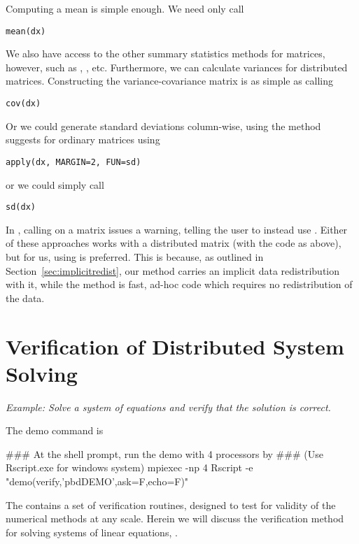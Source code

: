 Computing a mean is simple enough.  We need only call
\begin{lstlisting}[language=rr,title=Summary Statistics]
mean(dx)
\end{lstlisting}
We also have access to the other summary statistics methods for matrices, however, such as , , etc.  Furthermore, we can calculate variances for distributed matrices.  Constructing the variance-covariance matrix is as simple as calling
\begin{lstlisting}[language=rr,title=Summary Statistics]
cov(dx)
\end{lstlisting}
Or we could generate standard deviations column-wise, using the method  suggests for ordinary matrices using 
\begin{lstlisting}[language=rr,title=Summary Statistics]
apply(dx, MARGIN=2, FUN=sd)
\end{lstlisting}
or we could simply call
\begin{lstlisting}[language=rr,title=Summary Statistics]
sd(dx)
\end{lstlisting}
In , calling  on a matrix issues a warning, telling the user to instead use .  Either of these approaches works with a distributed matrix (with the code as above), but for us, using  is preferred.  This is because, as outlined in Section~\ref{sec:implicitredist}, our  method carries an implicit data redistribution with it, while the  method is fast, ad-hoc code which requires no redistribution of the data.





\section{Verification of Distributed System Solving}

\emph{Example:  Solve a system of equations and verify that the solution is correct.}

The demo command is
\begin{Command}
### At the shell prompt, run the demo with 4 processors by
### (Use Rscript.exe for windows system)
mpiexec -np 4 Rscript -e "demo(verify,'pbdDEMO',ask=F,echo=F)"
\end{Command}

The  contains a set of verification routines, designed to test for validity of the numerical methods at any scale.  Herein we will discuss the verification method for solving systems of linear equations, .

